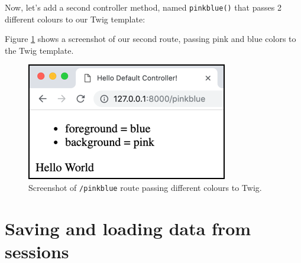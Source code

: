 \documentclass[a4paperpaper,openright]{book}
\newenvironment{Shaded}{}{}
\newcommand{\AnnotationTok}[1]{\textcolor[rgb]{0.38,0.63,0.69}{\textbf{\textit{#1}}}}
\newcommand{\CommentTok}[1]{\textcolor[rgb]{0.38,0.63,0.69}{\textit{#1}}}
\newcommand{\KeywordTok}[1]{\textcolor[rgb]{0.00,0.44,0.13}{\textbf{#1}}}
\newcommand{\NormalTok}[1]{#1}
\newcommand{\OtherTok}[1]{\textcolor[rgb]{0.00,0.44,0.13}{#1}}
\newcommand{\StringTok}[1]{\textcolor[rgb]{0.25,0.44,0.63}{#1}}
\begin{document}
Now, let's add a second controller method, named \texttt{pinkblue()}
that passes 2 different colours to our Twig template:

\begin{Shaded}
\end{Shaded}

Figure \ref{twig_colours} shows a screenshot of our second route,
passing pink and blue colors to the Twig template.

\begin{figure}
\centering
\includegraphics{./tex2pdf.-8a1528da847c818a/208cfa06fb9ee48e693def7d3b21bfe0a1bed489.png}
\caption{Screenshot of \texttt{/pinkblue} route passing different
colours to Twig. \label{twig_colours}}
\end{figure}

\hypertarget{saving-and-loading-data-from-sessions}{%
\chapter{Saving and loading data from
sessions}\label{saving-and-loading-data-from-sessions}}
\end{document}
